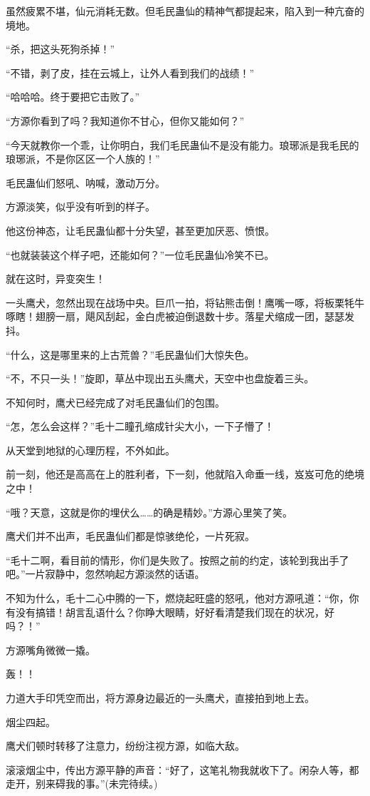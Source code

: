 \begin{this_body}
虽然疲累不堪，仙元消耗无数。但毛民蛊仙的精神气都提起来，陷入到一种亢奋的境地。

“杀，把这头死狗杀掉！”

“不错，剥了皮，挂在云城上，让外人看到我们的战绩！”

“哈哈哈。终于要把它击败了。”

“方源你看到了吗？我知道你不甘心，但你又能如何？”

“今天就教你一个乖，让你明白，我们毛民蛊仙不是没有能力。琅琊派是我毛民的琅琊派，不是你区区一个人族的！”

毛民蛊仙们怒吼、呐喊，激动万分。

方源淡笑，似乎没有听到的样子。

他这份神态，让毛民蛊仙都十分失望，甚至更加厌恶、愤恨。

“也就装装这个样子吧，还能如何？”一位毛民蛊仙冷笑不已。

就在这时，异变突生！

一头鹰犬，忽然出现在战场中央。巨爪一拍，将钻熊击倒！鹰嘴一啄，将板栗牦牛啄瞎！翅膀一扇，飓风刮起，金白虎被迫倒退数十步。落星犬缩成一团，瑟瑟发抖。

“什么，这是哪里来的上古荒兽？”毛民蛊仙们大惊失色。

“不，不只一头！”旋即，草丛中现出五头鹰犬，天空中也盘旋着三头。

不知何时，鹰犬已经完成了对毛民蛊仙们的包围。

“怎，怎么会这样？”毛十二瞳孔缩成针尖大小，一下子懵了！

从天堂到地狱的心理历程，不外如此。

前一刻，他还是高高在上的胜利者，下一刻，他就陷入命垂一线，岌岌可危的绝境之中！

“哦？天意，这就是你的埋伏么……的确是精妙。”方源心里笑了笑。

鹰犬们并不出声，毛民蛊仙们都是惊骇绝伦，一片死寂。

“毛十二啊，看目前的情形，你们是失败了。按照之前的约定，该轮到我出手了吧。”一片寂静中，忽然响起方源淡然的话语。

不知为什么，毛十二心中腾的一下，燃烧起旺盛的怒吼，他对方源吼道：“你，你有没有搞错！胡言乱语什么？你睁大眼睛，好好看清楚我们现在的状况，好吗？！”

方源嘴角微微一撬。

轰！！

力道大手印凭空而出，将方源身边最近的一头鹰犬，直接拍到地上去。

烟尘四起。

鹰犬们顿时转移了注意力，纷纷注视方源，如临大敌。

滚滚烟尘中，传出方源平静的声音：“好了，这笔礼物我就收下了。闲杂人等，都走开，别来碍我的事。”(未完待续。)

\end{this_body}

